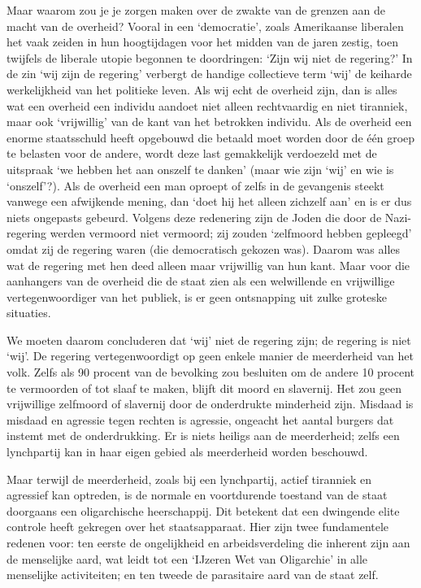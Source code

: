\documentclass[
  a5paper,
  smalldemyvopaper,10pt,twoside,onecolumn,openright,extrafontsizes,hidelinks]{memoir}
\begin{document}
Maar waarom zou je je zorgen maken over de zwakte van de grenzen aan de
macht van de overheid? Vooral in een `democratie', zoals Amerikaanse
liberalen het vaak zeiden in hun hoogtijdagen voor het midden van de
jaren zestig, toen twijfels de liberale utopie begonnen te doordringen:
`Zijn wij niet de regering?' In de zin `wij zijn de regering' verbergt
de handige collectieve term `wij' de keiharde werkelijkheid van het
politieke leven. Als wij echt de overheid zijn, dan is alles wat een
overheid een individu aandoet niet alleen rechtvaardig en niet
tiranniek, maar ook `vrijwillig' van de kant van het betrokken individu.
Als de overheid een enorme staatsschuld heeft opgebouwd die betaald moet
worden door de één groep te belasten voor de andere, wordt deze last
gemakkelijk verdoezeld met de uitspraak `we hebben het aan onszelf te
danken' (maar wie zijn `wij' en wie is `onszelf'?). Als de overheid een
man oproept of zelfs in de gevangenis steekt vanwege een afwijkende
mening, dan `doet hij het alleen zichzelf aan' en is er dus niets
ongepasts gebeurd. Volgens deze redenering zijn de Joden die door de
Nazi-regering werden vermoord niet vermoord; zij zouden `zelfmoord
hebben gepleegd' omdat zij de regering waren (die democratisch gekozen
was). Daarom was alles wat de regering met hen deed alleen maar
vrijwillig van hun kant. Maar voor die aanhangers van de overheid die de
staat zien als een welwillende en vrijwillige vertegenwoordiger van het
publiek, is er geen ontsnapping uit zulke groteske situaties.

We moeten daarom concluderen dat `wij' niet de regering zijn; de
regering is niet `wij'. De regering vertegenwoordigt op geen enkele
manier de meerderheid van het volk. Zelfs als 90 procent van de
bevolking zou besluiten om de andere 10 procent te vermoorden of tot
slaaf te maken, blijft dit moord en slavernij. Het zou geen vrijwillige
zelfmoord of slavernij door de onderdrukte minderheid zijn. Misdaad is
misdaad en agressie tegen rechten is agressie, ongeacht het aantal
burgers dat instemt met de onderdrukking. Er is niets heiligs aan de
meerderheid; zelfs een lynchpartij kan in haar eigen gebied als
meerderheid worden beschouwd.

Maar terwijl de meerderheid, zoals bij een lynchpartij, actief tiranniek
en agressief kan optreden, is de normale en voortdurende toestand van de
staat doorgaans een oligarchische heerschappij. Dit betekent dat een
dwingende elite controle heeft gekregen over het staatsapparaat. Hier
zijn twee fundamentele redenen voor: ten eerste de ongelijkheid en
arbeidsverdeling die inherent zijn aan de menselijke aard, wat leidt tot
een `IJzeren Wet van Oligarchie' in alle menselijke activiteiten; en ten
tweede de parasitaire aard van de staat zelf.
\end{document}
